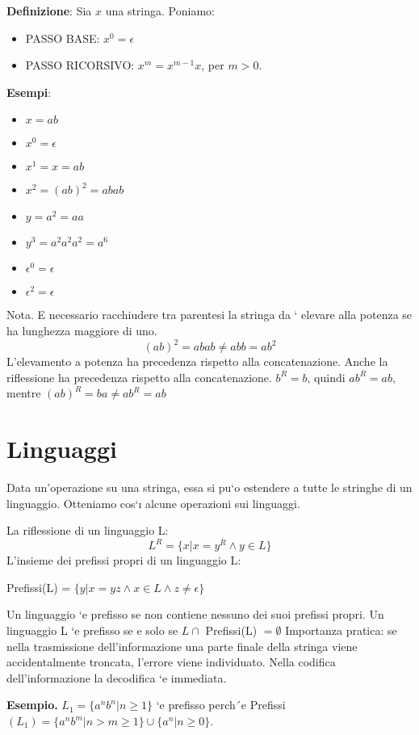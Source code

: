 \textbf{Definizione}: Sia \(x\) una stringa. Poniamo:
\begin{itemize}
    \item PASSO BASE: \(x^0 = \epsilon\)
    \item PASSO RICORSIVO: \(x^m = x^{m-1}x\), per \(m > 0\).
\end{itemize}
\textbf{Esempi}:
\begin{itemize}
    \item \(x = ab\)
    \item \(x^0 = \epsilon\)
    \item \(x^1 = x = ab\)
    \item \(x^2 = (ab)^2 = abab\)
    \item \(y = a^2 = aa\)
    \item \(y^3 = a^{2}a^{2}a^{2} = a^6\)
    \item \(\epsilon^0 = \epsilon\)
    \item \(\epsilon^2 = \epsilon\)
\end{itemize}
Nota. E necessario racchiudere tra parentesi la stringa da `
elevare alla potenza se ha lunghezza maggiore di uno.
\[(ab)^2 = abab \neq abb = ab^2\]
L’elevamento a potenza ha precedenza rispetto alla
concatenazione.
Anche la riflessione ha precedenza rispetto alla
concatenazione.
\(b^R = b\), quindi \(ab^R = ab\), mentre \((ab)^R = ba \neq ab^R = ab\)

\section{Linguaggi}
Data un’operazione su una stringa, essa si pu`o estendere a
tutte le stringhe di un linguaggio.
Otteniamo cos`ı alcune operazioni sui linguaggi.

La riflessione di un linguaggio L:
\[L^R = \{x | x = y^R \wedge y \in L\}\]
L’insieme dei prefissi propri di un linguaggio L:
\begin{center}
Prefissi(L) = \(\{y | x = yz \wedge x \in L \wedge z \neq \epsilon\}\)
\end{center}

Un linguaggio `e prefisso se non contiene nessuno dei suoi
prefissi propri.
Un linguaggio L `e prefisso se e solo se
\(L \cap\) Prefissi(L) \(= \emptyset\)
Importanza pratica: se nella trasmissione dell’informazione
una parte finale della stringa viene accidentalmente troncata,
l’errore viene individuato.
Nella codifica dell’informazione la decodifica `e immediata.

\textbf{Esempio.} \(L_1 = \{a^{n}b^{n}| n \geq 1\}\) `e prefisso perch´e
Prefissi\((L_1) = \{a^{n}b^{m} | n > m \geq 1\} \cup \{a^{n}| n \geq 0\}\).


